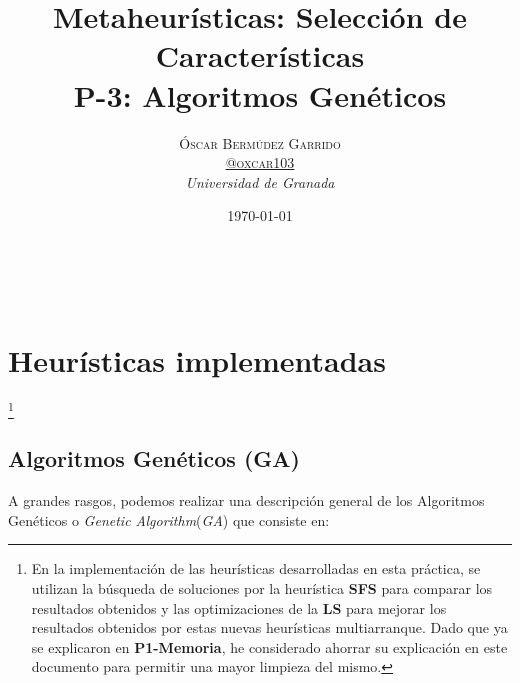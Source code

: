 \documentclass[a4paper, 11pt]{article}
\title{\textbf{Metaheurísticas: Selección de Características}\\ %
P-3: Algoritmos Genéticos} %
\author{\textsc{Óscar Bermúdez Garrido\\
\href{http://www.github.com/oxcar103}{@oxcar103}} %
\\{\textit{Universidad de Granada}}} %
\date{\today} %
\makeatletter
\renewcommand{\maketitle}{
  \begin{flushright} %
  {\LARGE\@title} %
  
  \vspace{50pt} %
  
  {\large\@author} %
  \\\@date %
  \vspace{40pt} %
  \end{flushright}
}
\makeatother
\begin{document}
\maketitle %

\renewcommand{\abstractname}{Resumen} %



{\parskip=2pt
  \tableofcontents
}
\pagebreak

	
	
	
	\section{Heurísticas implementadas}\footnote{En la implementación de las heurísticas desarrolladas
	en esta práctica, se utilizan la búsqueda de soluciones por la heurística \textbf{SFS} para comparar
	los resultados obtenidos y las optimizaciones de la \textbf{LS} para mejorar los resultados obtenidos
	por estas nuevas heurísticas multiarranque. Dado que ya se explicaron en \textbf{P1-Memoria}, he
	considerado ahorrar su explicación en este documento para permitir una mayor limpieza del mismo.}
	
		\subsection{Algoritmos Genéticos (\textbf{GA})}
			A grandes rasgos, podemos realizar una descripción general de los Algoritmos Genéticos o
			\textit{Genetic Algorithm}(\textit{GA}) que consiste en:
			
\end{document}
